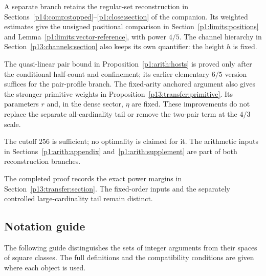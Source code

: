 A separate branch retains the regular-set reconstruction in
Sections~\ref{p14:comp:stopped}--\ref{p1:close:section} of the
companion. Its weighted estimates give the unsigned positional
comparison in Section~\ref{p1:limits:positions} and
Lemma~\ref{p1:limits:vector-reference}, with power \(4/5\).
The channel hierarchy in Section~\ref{p13:channels:section}
also keeps its own quantifier: the height \(h\) is fixed.

The quasi-linear pair bound in Proposition~\ref{p1:arith:hosts} is
proved only after the conditional half-count and confinement; its
earlier elementary $6/5$ version suffices for the pair-profile branch.
The fixed-arity anchored argument also gives the stronger primitive
weights in Proposition~\ref{p13:transfer:primitive}. Its parameters
$r$ and, in the dense sector, $\eta$ are fixed. These improvements
do not replace the separate all-cardinality tail or remove the
two-pair term at the $4/3$ scale.

The cutoff \(256\) is sufficient; no optimality is claimed for it.
The arithmetic inputs in Sections~\ref{p1:arith:appendix}
and~\ref{p1:arith:supplement} are part of both reconstruction branches.

The completed proof records the exact power margins in
Section~\ref{p13:transfer:section}. The fixed-order inputs and the
separately controlled large-cardinality tail remain distinct.

\subsection{Notation guide}
\label{p1:intro:notation}

The following guide distinguishes the sets of integer arguments
from their spaces of square classes. The full definitions and
the compatibility conditions are given where each object is used.

